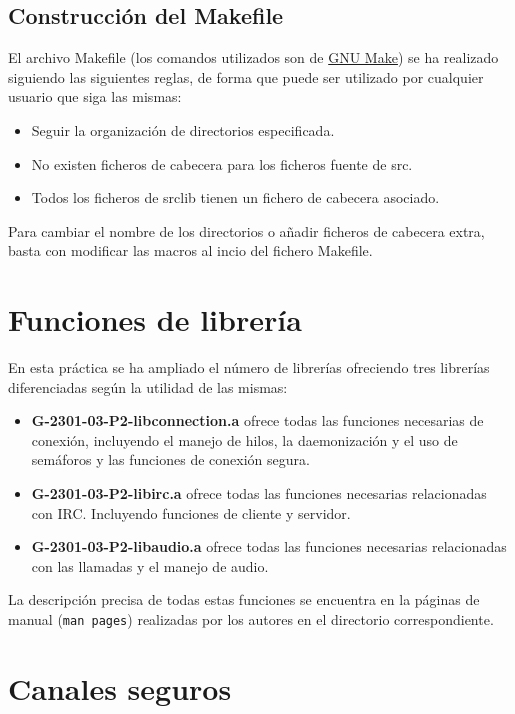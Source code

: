 \documentclass{mathnotes}
\begin{document}
\subsection{Construcción del Makefile}
El archivo Makefile (los comandos utilizados son de \href{https://www.gnu.org/software/make/manual/make.html#Top}{GNU Make}) se ha realizado siguiendo las siguientes reglas, de forma que puede ser utilizado por cualquier usuario que siga las mismas:
\begin{itemize}
\item Seguir la organización de directorios especificada.
\item No existen ficheros de cabecera para los ficheros fuente de src.
\item Todos los ficheros de srclib tienen un fichero de cabecera asociado.
\end{itemize}
Para cambiar el nombre de los directorios o añadir ficheros de cabecera extra, basta con modificar las macros al incio del fichero Makefile.

\section{Funciones de librería}
En esta práctica se ha ampliado el número de librerías ofreciendo tres librerías diferenciadas según la utilidad de las mismas:

\begin{itemize}
\item \textbf{G-2301-03-P2-libconnection.a} ofrece todas las funciones necesarias de conexión, incluyendo el manejo de hilos, la daemonización y el uso de semáforos y las funciones de conexión segura.

\item \textbf{G-2301-03-P2-libirc.a} ofrece todas las funciones necesarias relacionadas con IRC. Incluyendo funciones de cliente y servidor.

\item \textbf{G-2301-03-P2-libaudio.a} ofrece todas las funciones necesarias relacionadas con las llamadas y el manejo de audio.
\end{itemize}

La descripción precisa de todas estas funciones se encuentra en la páginas de manual (\texttt{man pages}) realizadas por los autores en el directorio correspondiente.

\section{Canales seguros}
\end{document}
